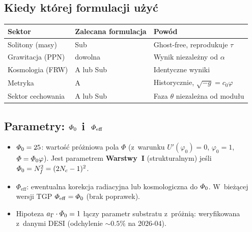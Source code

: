 \subsection{Kiedy której formulacji użyć}

\begin{center}\small
\begin{tabular}{@{}lll@{}}
\toprule
\textbf{Sektor} & \textbf{Zalecana formulacja} & \textbf{Powód} \\
\midrule
Solitony (masy) & Sub & Ghost-free, reprodukuje $\tau$ \\
Grawitacja (PPN) & dowolna & Wynik niezależny od $\alpha$ \\
Kosmologia (FRW) & A lub Sub & Identyczne wyniki \\
Metryka & A & Historycznie, $\sqrt{-g} = c_0\varphi$ \\
Sektor cechowania & A lub Sub & Faza $\theta$ niezależna od modułu \\
\bottomrule
\end{tabular}
\end{center}

\subsection{Parametry: $\varPhi_0$ i~$\varPhi_{\mathrm{eff}}$}

\begin{remark}
\begin{itemize}[nosep]
  \item $\varPhi_0 = 25$: wartość próżniowa pola $\Phi$
    (z~warunku $U'(\varphi_0) = 0$, $\varphi_0 = 1$,
    $\varPhi = \varPhi_0\varphi$). Jest parametrem \textbf{Warstwy~I}
    (strukturalnym) jeśli $\varPhi_0 = N_f^2 = (2N_c - 1)^2$.
  \item $\Phi_{\mathrm{eff}}$: ewentualna korekcja radiacyjna
    lub kosmologiczna do $\varPhi_0$. W~bieżącej wersji TGP
    $\varPhi_{\mathrm{eff}} = \varPhi_0$ (brak poprawek).
  \item Hipoteza $a_\Gamma \cdot \varPhi_0 = 1$ łączy parametr
    substratu z~próżnią: weryfikowana z~danymi DESI
    (odchylenie $\sim 0.5\%$ na 2026-04).
\end{itemize}
\end{remark}

